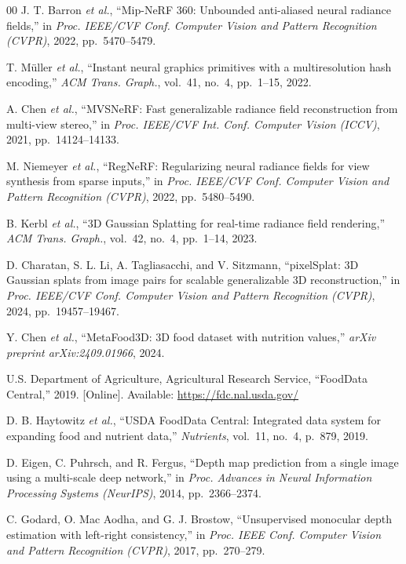 \documentclass[conference]{IEEEtran}
\begin{document}
\begin{thebibliography}{00}
J. T. Barron \textit{et al.},
``Mip-NeRF 360: Unbounded anti-aliased neural radiance fields,''
in \textit{Proc. IEEE/CVF Conf. Computer Vision and Pattern Recognition (CVPR)},
2022, pp.~5470--5479.

T. M\"uller \textit{et al.},
``Instant neural graphics primitives with a multiresolution hash encoding,''
\textit{ACM Trans. Graph.}, vol.~41, no.~4, pp.~1--15, 2022.

A. Chen \textit{et al.},
``MVSNeRF: Fast generalizable radiance field reconstruction from multi-view stereo,''
in \textit{Proc. IEEE/CVF Int. Conf. Computer Vision (ICCV)}, 2021, pp.~14124--14133.

M. Niemeyer \textit{et al.},
``RegNeRF: Regularizing neural radiance fields for view synthesis from sparse inputs,''
in \textit{Proc. IEEE/CVF Conf. Computer Vision and Pattern Recognition (CVPR)},
2022, pp.~5480--5490.

B. Kerbl \textit{et al.},
``3D Gaussian Splatting for real-time radiance field rendering,''
\textit{ACM Trans. Graph.}, vol.~42, no.~4, pp.~1--14, 2023.

D. Charatan, S. L. Li, A. Tagliasacchi, and V. Sitzmann,
``pixelSplat: 3D Gaussian splats from image pairs for scalable generalizable
3D reconstruction,''
in \textit{Proc. IEEE/CVF Conf. Computer Vision and Pattern Recognition (CVPR)},
2024, pp.~19457--19467.

Y. Chen \textit{et al.},
``MetaFood3D: 3D food dataset with nutrition values,''
\textit{arXiv preprint arXiv:2409.01966}, 2024.

U.S. Department of Agriculture, Agricultural Research Service,
``FoodData Central,'' 2019.
[Online]. Available: \url{https://fdc.nal.usda.gov/}

D. B. Haytowitz \textit{et al.},
``USDA FoodData Central: Integrated data system for expanding food and nutrient data,''
\textit{Nutrients}, vol.~11, no.~4, p.~879, 2019.

D. Eigen, C. Puhrsch, and R. Fergus,
``Depth map prediction from a single image using a multi-scale deep network,''
in \textit{Proc. Advances in Neural Information Processing Systems (NeurIPS)},
2014, pp.~2366--2374.

C. Godard, O. Mac Aodha, and G. J. Brostow,
``Unsupervised monocular depth estimation with left-right consistency,''
in \textit{Proc. IEEE Conf. Computer Vision and Pattern Recognition (CVPR)},
2017, pp.~270--279.

\end{thebibliography}
\end{document}
